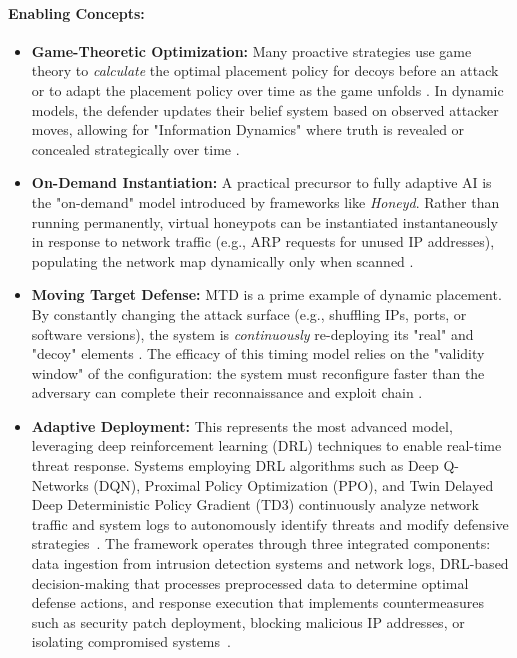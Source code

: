 \paragraph{Enabling Concepts:}
\begin{itemize}
      \item \textbf{Game-Theoretic Optimization:} Many proactive strategies use game theory to \textit{calculate}
            the optimal placement policy for decoys before an attack or to adapt the placement policy over time as the
            game unfolds \cite{carroll2011game,schlenker2018deceiving}. In dynamic models, the defender updates their
            belief system based on observed attacker moves, allowing for "Information Dynamics" where truth is revealed
            or concealed strategically over time \cite{pawlick2019game}.
      \item \textbf{On-Demand Instantiation:} A practical precursor to fully adaptive AI is the "on-demand" model
            introduced by frameworks like \textit{Honeyd}. Rather than running permanently, virtual honeypots can be
            instantiated instantaneously in response to network traffic (e.g., ARP requests for unused IP addresses),
            populating the network map dynamically only when scanned \cite{provos2004virtual}.
      \item \textbf{Moving Target Defense:} MTD is a prime example of dynamic placement. By constantly changing the
            attack surface (e.g., shuffling IPs, ports, or software versions), the system is \textit{continuously}
            re-deploying its "real" and "decoy" elements \cite{jajodia2011moving}. The efficacy of this timing model
            relies on the "validity window" of the configuration: the system must reconfigure faster than the
            adversary can complete their reconnaissance and exploit chain \cite{jajodia2011moving}.
      \item \textbf{Adaptive Deployment:} This represents the most advanced model, leveraging deep reinforcement
            learning (DRL) techniques to enable real-time threat response. Systems employing DRL algorithms such as Deep
            Q-Networks (DQN), Proximal Policy Optimization (PPO), and Twin Delayed Deep Deterministic Policy Gradient (TD3)
            continuously analyze network traffic and system logs to autonomously identify threats and modify defensive
            strategies~\cite{hammad2024deep}. The framework operates through three integrated components: data ingestion
            from intrusion detection systems and network logs, DRL-based decision-making that processes preprocessed
            data to determine optimal defense actions, and response execution that implements countermeasures such
            as security patch deployment, blocking malicious IP addresses, or isolating compromised systems~\cite{hammad2024deep}.
\end{itemize}

